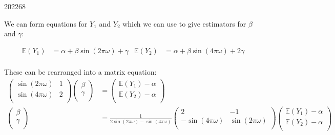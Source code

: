 \documentclass[10pt,\jkfside,a4paper]{article}
\begin{document}
\begin{examquestion}{2022}{6}{8}
\begin{enumerate}[label=(\alph*)]
We can form equations for $Y_1$ and $Y_2$ which we can use to give
estimators for $\beta$ and $\gamma$:

\begin{align*}
\mathbb{E}(Y_1) &= \alpha + \beta\sin(2\pi\omega) + \gamma & \mathbb{E}
(Y_2) &= \alpha + \beta\sin(4\pi\omega) + 2\gamma \\
\end{align*}

These can be rearranged into a matrix equation:
\[
\begin{split}
\begin{pmatrix}
\sin(2\pi\omega) & 1 \\
\sin(4\pi\omega) & 2 \\
\end{pmatrix}
\begin{pmatrix}
\beta \\ \gamma \\
\end{pmatrix}
&=
\begin{pmatrix}
\mathbb{E}(Y_1) - \alpha \\
 \mathbb{E}(Y_2) - \alpha \\
\end{pmatrix} \\
\begin{pmatrix}
\beta \\ \gamma \\
\end{pmatrix}
&=
\frac{1}{2\sin(2\pi\omega) - \sin(4\pi\omega)}
\begin{pmatrix}
2 & -1 \\
-\sin(4\pi\omega) & \sin(2\pi\omega) \\
\end{pmatrix}
\begin{pmatrix}
\mathbb{E}(Y_1) - \alpha \\
 \mathbb{E}(Y_2) - \alpha \\
\end{pmatrix} \\
\end{split}
\]

\end{enumerate}

\end{examquestion}
\end{document}

